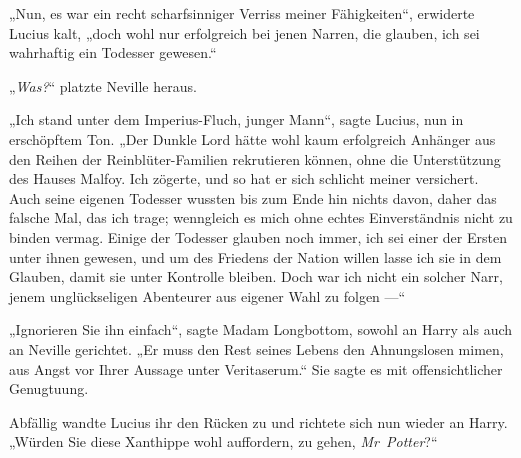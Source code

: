 „Nun, es war ein recht scharfsinniger Verriss meiner Fähigkeiten“, erwiderte Lucius kalt, „doch wohl nur erfolgreich bei jenen Narren, die glauben, ich sei wahrhaftig ein Todesser gewesen.“

„\emph{Was?}“ platzte Neville heraus.

„Ich stand unter dem Imperius-Fluch, junger Mann“, sagte Lucius, nun in erschöpftem Ton.
„Der Dunkle Lord hätte wohl kaum erfolgreich Anhänger aus den Reihen der Reinblüter-Familien rekrutieren können, ohne die Unterstützung des Hauses Malfoy. Ich zögerte, und so hat er sich schlicht meiner versichert. Auch seine eigenen Todesser wussten bis zum Ende hin nichts davon, daher das falsche Mal, das ich trage; wenngleich es mich ohne echtes Einverständnis nicht zu binden vermag. Einige der Todesser glauben noch immer, ich sei einer der Ersten unter ihnen gewesen, und um des Friedens der Nation willen lasse ich sie in dem Glauben, damit sie unter Kontrolle bleiben. Doch war ich nicht ein solcher Narr, jenem unglückseligen Abenteurer aus eigener Wahl zu folgen —“

„Ignorieren Sie ihn einfach“, sagte Madam Longbottom, sowohl an Harry als auch an Neville gerichtet.
„Er muss den Rest seines Lebens den Ahnungslosen mimen, aus Angst vor Ihrer Aussage unter Veritaserum.“ Sie sagte es mit offensichtlicher Genugtuung.

Abfällig wandte Lucius ihr den Rücken zu und richtete sich nun wieder an Harry.
„Würden Sie diese Xanthippe wohl auffordern, zu gehen, \emph{Mr~Potter}?“

